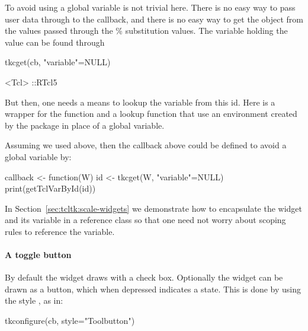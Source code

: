To avoid using a global variable is not trivial here. There is no easy
way to pass user data through to the callback, and there is no easy
way to get the \R\/ object from the values passed through the \%
substitution values. The variable holding the value can be found
through
\begin{Schunk}
\begin{Sinput}
 tkcget(cb, "variable"=NULL)
\end{Sinput}
\begin{Soutput}
<Tcl> ::RTcl5 
\end{Soutput}
\end{Schunk}

But then, one needs a means to lookup the variable from this id. Here is a
wrapper for the  function and a lookup function that
use an environment created by the  package in place of a
global variable.

\begin{Schunk}
\end{Schunk}

Assuming we used  above, then the callback above
could be defined to avoid a global variable by:


\begin{Schunk}
\begin{Sinput}
 callback <- function(W) {
   id <- tkcget(W, "variable"=NULL)
   print(getTclVarById(id))
 }
\end{Sinput}
\end{Schunk}


In Section~\ref{sec:tcltk:scale-widgets} we demonstrate how to encapsulate the widget and its
variable in a reference class so that one need not worry about scoping
rules to reference the variable. 


\paragraph{A toggle button}

By default the widget draws with a check box. Optionally the widget
can be drawn as a button, which when depressed indicates a 
state. This is done by using the style , as in:
\begin{Schunk}
\begin{Sinput}
 tkconfigure(cb, style="Toolbutton")
\end{Sinput}
\end{Schunk}

